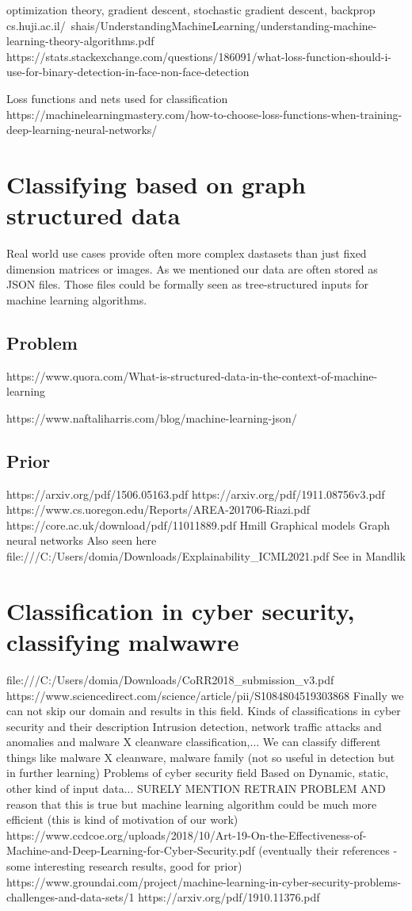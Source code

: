 optimization theory, gradient descent, stochastic gradient descent, backprop
cs.huji.ac.il/~shais/UnderstandingMachineLearning/understanding-machine-learning-theory-algorithms.pdf
https://stats.stackexchange.com/questions/186091/what-loss-function-should-i-use-for-binary-detection-in-face-non-face-detection

Loss functions and nets used for classification
https://machinelearningmastery.com/how-to-choose-loss-functions-when-training-deep-learning-neural-networks/

\section{Classifying based on graph structured data}
Real world use cases provide often more complex dastasets than just fixed dimension matrices or images. As we mentioned our data are often stored as JSON files. Those files could be formally seen as tree-structured inputs for machine learning algorithms. 
\subsection{Problem}
https://www.quora.com/What-is-structured-data-in-the-context-of-machine-learning

https://www.naftaliharris.com/blog/machine-learning-json/

\subsection{Prior}
https://arxiv.org/pdf/1506.05163.pdf
https://arxiv.org/pdf/1911.08756v3.pdf
https://www.cs.uoregon.edu/Reports/AREA-201706-Riazi.pdf
https://core.ac.uk/download/pdf/11011889.pdf
Hmill
Graphical models
Graph neural networks
    Also seen here file:///C:/Users/domia/Downloads/Explainability_ICML2021.pdf
See in Mandlik

\section{Classification in cyber security, classifying malwawre}
file:///C:/Users/domia/Downloads/CoRR2018_submission_v3.pdf
https://www.sciencedirect.com/science/article/pii/S1084804519303868
Finally we can not skip our domain and results in this field. 
Kinds of classifications in cyber security and their description
Intrusion detection, network traffic attacks and anomalies and malware X cleanware classification,...
We can classify different things like malware X cleanware, malware family (not so useful in detection but in further learning)
Problems of cyber security field
Based on Dynamic, static, other kind of input data...
SURELY MENTION RETRAIN PROBLEM AND reason that this is true but machine learning algorithm could be much more efficient (this is kind of motivation of our work)
https://www.ccdcoe.org/uploads/2018/10/Art-19-On-the-Effectiveness-of-Machine-and-Deep-Learning-for-Cyber-Security.pdf (eventually their references - some interesting research results, good for prior)
https://www.groundai.com/project/machine-learning-in-cyber-security-problems-challenges-and-data-sets/1
https://arxiv.org/pdf/1910.11376.pdf

